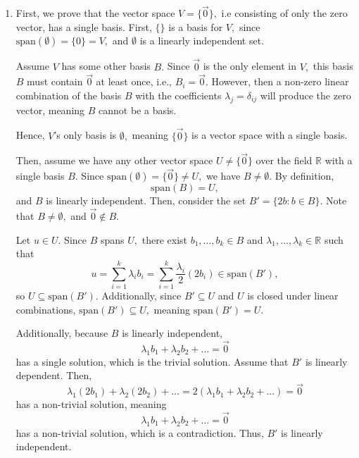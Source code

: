 \documentclass[12pt]{article}
\begin{document}
\begin{enumerate}
    Note that $T(p + q) = (p + q)(1) = p(1) + q(1) = Tp + Tq,$
    $T(\lambda p) = (\lambda p)(1) = \lambda p(1) = \lambda T(p)$ and
    $Tc = c$ for $c \in \mathbb F,$ meaning $T$ is a surjective
    linear map, mapping from a space with dimension $m + 1$ to a
    space with dimension $1.$

    Hence, the null space of $T$ has dimension $m$ by the
    rank-nullity theorem. The null space consists of all $p \in
    \mathcal P_m(\mathbb F)$ such that $p(1) = 0.$ Thus, the $m + 1$
    vectors $p_0, \ldots, p_m$ reside in a space of dimension $m,$
    and thus they must be linearly dependent, as required.

  \item First, we prove that the vector space $V = \{\vec 0\},$ i.e
    consisting of only the zero vector, has a single basis. First,
    $\{\}$ is a basis for $V,$ since $\text{span}(\emptyset) = \{0\}
    = V,$ and $\emptyset$ is a linearly independent set.

    Assume $V$ has some other basis $B.$ Since $\vec 0$ is the only
    element in $V,$ this basis $B$ must contain $\vec 0$ at least
    once, i.e., $B_i = \vec 0.$ However, then a non-zero linear
    combination of the basis $B$ with the coefficients $\lambda_j =
    \delta_{ij}$ will produce the zero vector, meaning $B$ cannot be a basis.

    Hence, $V$'s only basis is $\emptyset,$ meaning $\{\vec 0\}$ is a
    vector space with a single basis.

    Then, assume we have any other vector space $U \neq \{\vec 0\}$
    over the field $\mathbb R$ with a single basis $B.$ Since
    $\text{span}(\emptyset) = \{\vec 0\} \neq U,$ we have $B \neq
    \emptyset.$ By definition,
    $$
    \text{span}(B) = U,
    $$
    and $B$ is linearly independent. Then, consider the set $B' =
    \{2b : b \in B\}.$ Note that $B \neq \emptyset,$ and $\vec 0 \not \in B.$

    Let $u \in U.$ Since $B$ spans $U,$ there exist $b_1, \ldots, b_k
    \in B$ and $\lambda_1, \ldots, \lambda_k \in \mathbb R$ such that
    $$
    u = \sum_{i=1}^{k} \lambda_i b_i = \sum_{i=1}^{k}
    \frac{\lambda_i}{2}(2b_i) \in \text{span}(B'),
    $$
    so $U \subseteq \text{span}(B').$ Additionally, since $B'
    \subseteq U$ and $U$ is closed under linear combinations,
    $\text{span}(B') \subseteq U,$ meaning $\text{span}(B') = U.$

    Additionally, because $B$ is linearly independent,
    $$
    \lambda_1 b_1 + \lambda_2 b_2 + \ldots = \vec 0
    $$
    has a single solution, which is the trivial solution. Assume that
    $B'$ is linearly dependent. Then,
    $$
    \lambda_1 (2b_1) + \lambda_2 (2b_2) + \ldots =   2(\lambda_1 b_1
    + \lambda_2 b_2 + \ldots) = \vec 0
    $$
    has a non-trivial solution, meaning
    $$
    \lambda_1 b_1 + \lambda_2 b_2 + \ldots = \vec 0
    $$
    has a non-trivial solution, which is a contradiction. Thus, $B'$
    is linearly independent.


\end{enumerate}
\end{document}
